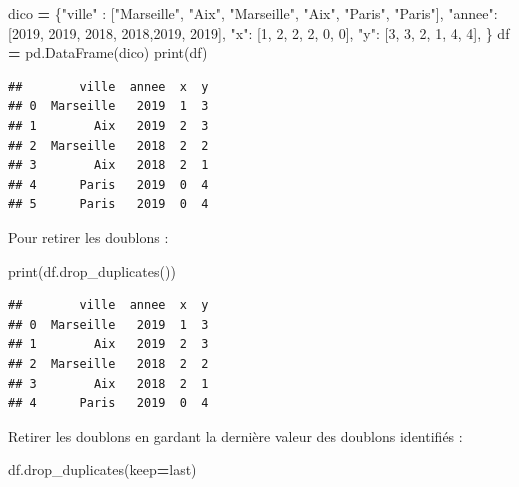 \documentclass[
  12pt,
]{book}
\newenvironment{Shaded}{\begin{snugshade}}{\end{snugshade}}
\newcommand{\BuiltInTok}[1]{#1}
\newcommand{\DecValTok}[1]{\textcolor[rgb]{0.00,0.00,0.81}{#1}}
\newcommand{\NormalTok}[1]{#1}
\newcommand{\OperatorTok}[1]{\textcolor[rgb]{0.81,0.36,0.00}{\textbf{#1}}}
\newcommand{\StringTok}[1]{\textcolor[rgb]{0.31,0.60,0.02}{#1}}
\numberwithin{equation}{section}
\numberwithin{countremarque}{section}
\begin{document}
\begin{Shaded}
\begin{Highlighting}[]
\NormalTok{dico }\OperatorTok{=}\NormalTok{ \{}\StringTok{"ville"}\NormalTok{ : [}\StringTok{"Marseille"}\NormalTok{, }\StringTok{"Aix"}\NormalTok{,}
                   \StringTok{"Marseille"}\NormalTok{, }\StringTok{"Aix"}\NormalTok{, }\StringTok{"Paris"}\NormalTok{, }\StringTok{"Paris"}\NormalTok{],}
        \StringTok{"annee"}\NormalTok{: [}\DecValTok{2019}\NormalTok{, }\DecValTok{2019}\NormalTok{, }\DecValTok{2018}\NormalTok{, }\DecValTok{2018}\NormalTok{,}\DecValTok{2019}\NormalTok{, }\DecValTok{2019}\NormalTok{],}
        \StringTok{"x"}\NormalTok{: [}\DecValTok{1}\NormalTok{, }\DecValTok{2}\NormalTok{, }\DecValTok{2}\NormalTok{, }\DecValTok{2}\NormalTok{, }\DecValTok{0}\NormalTok{, }\DecValTok{0}\NormalTok{],}
        \StringTok{"y"}\NormalTok{: [}\DecValTok{3}\NormalTok{, }\DecValTok{3}\NormalTok{, }\DecValTok{2}\NormalTok{, }\DecValTok{1}\NormalTok{, }\DecValTok{4}\NormalTok{, }\DecValTok{4}\NormalTok{],}
\NormalTok{       \} }
\NormalTok{df }\OperatorTok{=}\NormalTok{ pd.DataFrame(dico)}
\BuiltInTok{print}\NormalTok{(df)}
\end{Highlighting}
\end{Shaded}

\begin{lstlisting}
##        ville  annee  x  y
## 0  Marseille   2019  1  3
## 1        Aix   2019  2  3
## 2  Marseille   2018  2  2
## 3        Aix   2018  2  1
## 4      Paris   2019  0  4
## 5      Paris   2019  0  4
\end{lstlisting}

Pour retirer les doublons :

\begin{Shaded}
\begin{Highlighting}[]
\BuiltInTok{print}\NormalTok{(df.drop\_duplicates())}
\end{Highlighting}
\end{Shaded}

\begin{lstlisting}
##        ville  annee  x  y
## 0  Marseille   2019  1  3
## 1        Aix   2019  2  3
## 2  Marseille   2018  2  2
## 3        Aix   2018  2  1
## 4      Paris   2019  0  4
\end{lstlisting}

Retirer les doublons en gardant la dernière valeur des doublons identifiés :

\begin{Shaded}
\begin{Highlighting}[]
\NormalTok{df.drop\_duplicates(keep}\OperatorTok{=}\StringTok{\textquotesingle{}last\textquotesingle{}}\NormalTok{)}
\end{Highlighting}
\end{Shaded}
\end{document}
